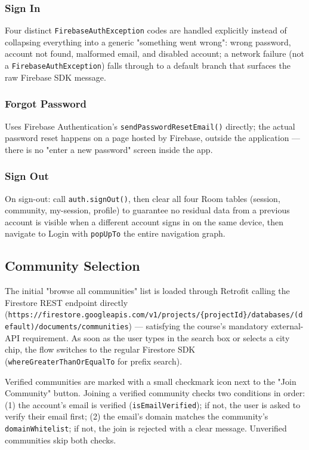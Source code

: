 \subsubsection{Sign In}

Four distinct \texttt{FirebaseAuthException} codes are handled explicitly instead of collapsing everything into a generic "something went wrong": wrong password, account not found, malformed email, and disabled account; a network failure (not a \texttt{FirebaseAuthException}) falls through to a default branch that surfaces the raw Firebase SDK message.

\subsubsection{Forgot Password}

Uses Firebase Authentication's \texttt{sendPasswordResetEmail()} directly; the actual password reset happens on a page hosted by Firebase, outside the application — there is no "enter a new password" screen inside the app.

\subsubsection{Sign Out}

On sign-out: call \texttt{auth.signOut()}, then clear all four Room tables (session, community, my-session, profile) to guarantee no residual data from a previous account is visible when a different account signs in on the same device, then navigate to Login with \texttt{popUpTo} the entire navigation graph.

\subsection{Community Selection}

The initial "browse all communities" list is loaded through Retrofit calling the Firestore REST endpoint directly (\texttt{https://firestore.googleapis.com/v1/projects/\{projectId\}/databases/(default)/documents/communities}) — satisfying the course's mandatory external-API requirement. As soon as the user types in the search box or selects a city chip, the flow switches to the regular Firestore SDK (\texttt{whereGreaterThanOrEqualTo} for prefix search).

Verified communities are marked with a small checkmark icon next to the "Join Community" button. Joining a verified community checks two conditions in order: (1) the account's email is verified (\texttt{isEmailVerified}); if not, the user is asked to verify their email first; (2) the email's domain matches the community's \texttt{domainWhitelist}; if not, the join is rejected with a clear message. Unverified communities skip both checks.

